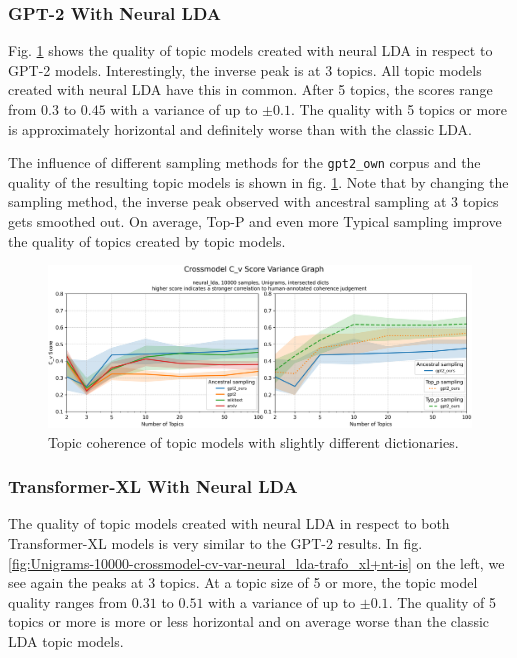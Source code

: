\subsubsection{GPT-2 With Neural LDA}
Fig. \ref{fig:Unigrams-10000-crossmodel-cv-var-neural_lda-gpt2+nt-is} shows the quality of topic models created with neural LDA in respect to GPT-2 models. Interestingly, the inverse peak is at 3 topics. All topic models created with neural LDA have this in common. After 5 topics, the scores range from $0.3$ to $0.45$ with a variance of up to $\pm0.1$. The quality with 5 topics or more is approximately horizontal and definitely worse than with the classic LDA. 

The influence of different sampling methods for the \texttt{gpt2\_own} corpus and the quality of the resulting topic models is shown in fig. \ref{fig:Unigrams-10000-crossmodel-cv-var-neural_lda-gpt2+nt-is}. Note that by changing the sampling method, the inverse peak observed with ancestral sampling at 3 topics gets smoothed out. On average, Top-P and even more Typical sampling improve the quality of topics created by topic models.
\begin{figure}[H]
    \centering
    \includegraphics[width=1\textwidth]{figures/Unigrams-10000-crossmodel-cv-var-neural_lda-gpt2+nt-is}
    \caption{Topic coherence of topic models with slightly different dictionaries.}
    \label{fig:Unigrams-10000-crossmodel-cv-var-neural_lda-gpt2+nt-is}
\end{figure}

\subsubsection{Transformer-XL With Neural LDA}
The quality of topic models created with neural LDA in respect to both Transformer-XL models is very similar to the GPT-2 results. In fig. \ref{fig:Unigrams-10000-crossmodel-cv-var-neural_lda-trafo_xl+nt-is} on the left, we see again the peaks at 3 topics. At a topic size of 5 or more, the topic model quality ranges from $0.31$ to $0.51$ with a variance of up to $\pm0.1$. The quality of 5 topics or more is more or less horizontal and on average worse than the classic LDA topic models. 

